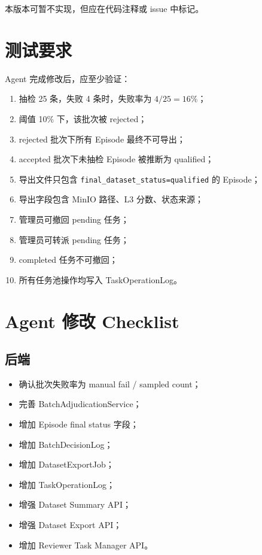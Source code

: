 \documentclass[UTF8,12pt,a4paper]{ctexart}
\begin{document}
本版本可暂不实现，但应在代码注释或 issue 中标记。

\section{测试要求}

Agent 完成修改后，应至少验证：

\begin{enumerate}
  \item 抽检 25 条，失败 4 条时，失败率为 $4/25=16\%$；
  \item 阈值 10\% 下，该批次被 rejected；
  \item rejected 批次下所有 Episode 最终不可导出；
  \item accepted 批次下未抽检 Episode 被推断为 qualified；
  \item 导出文件只包含 \texttt{final\_dataset\_status=qualified} 的 Episode；
  \item 导出字段包含 MinIO 路径、L3 分数、状态来源；
  \item 管理员可撤回 pending 任务；
  \item 管理员可转派 pending 任务；
  \item completed 任务不可撤回；
  \item 所有任务池操作均写入 TaskOperationLog。
\end{enumerate}

\section{Agent 修改 Checklist}

\subsection{后端}

\begin{itemize}
  \item 确认批次失败率为 manual fail / sampled count；
  \item 完善 BatchAdjudicationService；
  \item 增加 Episode final status 字段；
  \item 增加 BatchDecisionLog；
  \item 增加 DatasetExportJob；
  \item 增加 TaskOperationLog；
  \item 增强 Dataset Summary API；
  \item 增强 Dataset Export API；
  \item 增加 Reviewer Task Manager API。
\end{itemize}
\end{document}
